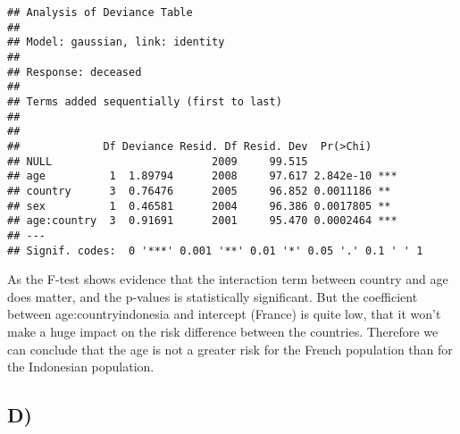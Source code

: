 \documentclass[
]{article}
\newenvironment{Shaded}{\begin{snugshade}}{\end{snugshade}}
\newcommand{\AttributeTok}[1]{\textcolor[rgb]{0.77,0.63,0.00}{#1}}
\newcommand{\ControlFlowTok}[1]{\textcolor[rgb]{0.13,0.29,0.53}{\textbf{#1}}}
\newcommand{\DecValTok}[1]{\textcolor[rgb]{0.00,0.00,0.81}{#1}}
\newcommand{\FunctionTok}[1]{\textcolor[rgb]{0.00,0.00,0.00}{#1}}
\newcommand{\NormalTok}[1]{#1}
\newcommand{\OtherTok}[1]{\textcolor[rgb]{0.56,0.35,0.01}{#1}}
\newcommand{\SpecialCharTok}[1]{\textcolor[rgb]{0.00,0.00,0.00}{#1}}
\newcommand{\StringTok}[1]{\textcolor[rgb]{0.31,0.60,0.02}{#1}}
\begin{document}
\begin{verbatim}
## Analysis of Deviance Table
## 
## Model: gaussian, link: identity
## 
## Response: deceased
## 
## Terms added sequentially (first to last)
## 
## 
##             Df Deviance Resid. Df Resid. Dev  Pr(>Chi)    
## NULL                         2009     99.515              
## age          1  1.89794      2008     97.617 2.842e-10 ***
## country      3  0.76476      2005     96.852 0.0011186 ** 
## sex          1  0.46581      2004     96.386 0.0017805 ** 
## age:country  3  0.91691      2001     95.470 0.0002464 ***
## ---
## Signif. codes:  0 '***' 0.001 '**' 0.01 '*' 0.05 '.' 0.1 ' ' 1
\end{verbatim}

As the F-test shows evidence that the interaction term between country
and age does matter, and the p-values is statistically significant. But
the coefficient between age:countryindonesia and intercept (France) is
quite low, that it won't make a huge impact on the risk difference
between the countries. Therefore we can conclude that the age is not a
greater risk for the French population than for the Indonesian
population.

\hypertarget{d-1}{%
\subsection{D)}\label{d-1}}

\begin{Shaded}
\end{Shaded}
\end{document}
